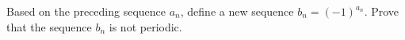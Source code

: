 Based on the preceding sequence $a_n$, define a new sequence $b_n = (-1)^{a_n}$. Prove that the sequence $b_n$ is not periodic.
